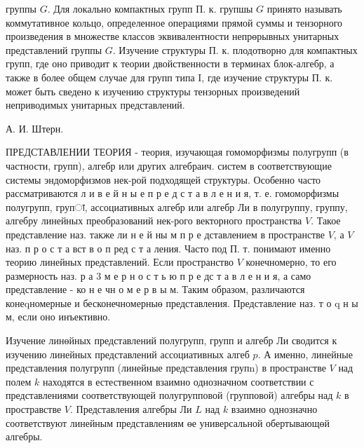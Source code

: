 \documentclass[10pt]{article}
\begin{document}
группы $G$. Для локально компактных групп П. к. групшы $G$ принято называть коммутативное кольцо, определенное операциями прямой суммы и тензорного произведения в множестве классов эквивалентности непрөрывных унитарных представлений группы $G$. Изучение структуры П. к. плодотворно для компактных групп, где оно приводит к теории двойственности в терминах блок-алгебр, а также в более общем случае для групп типа I, где изучение структуры П. к. может быть сведено к изучению структуры тензорных произведений неприводимых унитарных представлений.



А. И. Штерн.



ПРЕДСТАВЛЕНИИ ТЕОРИЯ - теория, изучающая гомоморфизмы полугрупп (в частности, групп), алгебр или других алгебраич. систем в соответствующие системы эндоморфизмов нек-рой подходящей структуры. Особенно часто рассматриваются л и в е й н ы е п р е д с т а в л е н и я, т. е. гомоморфизмы полугрупп, групा, ассоциативных алгебр или алгебр Ли в полугруппу, группу, алгебру линейных преобразований нек-рого векторного пространства $V$. Такое представление наз. также ли н е й ны м п р е дставлением в пространстве $V$, а $V$ наз. п р о с т а вст в о п ред с т а ления. Часто под П. т. понимают именно теорию линейных представлений. Если пространство $V$ конечномерно, то его размерность наз. р а 3 м е р н о с т ь ю п р е дс т а в л е н и я, а само представление - ко н е чн о м е р в ы м. Таким образом, различаются конеqномерные и бесконечномерныө представления. Представление наз. т о q н ы м, если оно инъективно.



Изучение линөйных представлений полугрупп, групп и алгебр Ли сводится к изучению линейных представлений ассоциативных алгеб $p$. А именно, линейные представления полугрупп (линейные представления групn) в пространстве $V$ над полем $k$ находятся в естественном взаимно однозначном соответствии с представлениями соответствующей полугрупповой (групповой) алгебры над $k$ в простравстве $V$. Представления алгебры Ли $L$ над $k$ взаимно однозначно соответствуют линейным представлениям өе универсальной обертывающөй алгебры.
\end{document}
